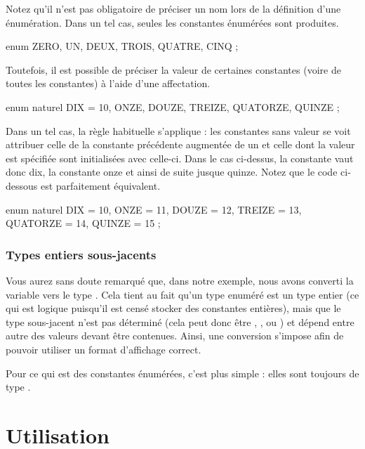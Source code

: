 \begin{infobox}
  Notez qu'il n'est pas obligatoire de
préciser un nom lors de la définition d'une énumération. Dans un tel
cas, seules les constantes énumérées sont produites.
\begin{C}
enum { ZERO, UN, DEUX, TROIS, QUATRE, CINQ };
\end{C}
\end{infobox}

Toutefois, il est possible de préciser la valeur de certaines constantes
(voire de toutes les constantes) à l'aide d'une affectation.

\begin{C}
enum naturel { DIX = 10, ONZE, DOUZE, TREIZE, QUATORZE, QUINZE };
\end{C}

Dans un tel cas, la règle habituelle s'applique : les constantes sans
valeur se voit attribuer celle de la constante précédente augmentée de
un et celle dont la valeur est spécifiée sont initialisées avec
celle-ci. Dans le cas ci-dessus, la constante  vaut donc
dix, la constante  onze et ainsi de suite jusque quinze.
Notez que le code ci-dessous est parfaitement équivalent.

\begin{C}
enum naturel { DIX = 10, ONZE = 11, DOUZE = 12, TREIZE = 13, QUATORZE = 14, QUINZE = 15 };
\end{C}

\subsubsection{Types entiers sous-jacents}
\label{types-entiers-sous-jacents}

Vous aurez sans doute remarqué que, dans notre exemple, nous avons
converti la variable  vers le type . Cela tient au
fait qu'un type enuméré est un type entier (ce qui est logique puisqu'il
est censé stocker des constantes entières), mais que le type sous-jacent
n'est pas déterminé (cela peut donc être , ,
 ou ) et dépend entre autre des valeurs devant
être contenues. Ainsi, une conversion s'impose afin de pouvoir utiliser
un format d'affichage correct.

Pour ce qui est des constantes énumérées, c'est plus simple : elles sont
toujours de type .

\section{Utilisation }
\label{utilisation-4}

